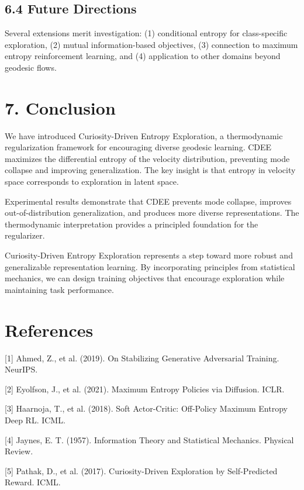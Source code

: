 \documentclass[12pt]{article}
\begin{document}
\subsection{6.4 Future Directions}

Several extensions merit investigation: (1) conditional entropy for class-specific exploration, (2) mutual information-based objectives, (3) connection to maximum entropy reinforcement learning, and (4) application to other domains beyond geodesic flows.

\section{7. Conclusion}

We have introduced Curiosity-Driven Entropy Exploration, a thermodynamic regularization framework for encouraging diverse geodesic learning. CDEE maximizes the differential entropy of the velocity distribution, preventing mode collapse and improving generalization. The key insight is that entropy in velocity space corresponds to exploration in latent space.

Experimental results demonstrate that CDEE prevents mode collapse, improves out-of-distribution generalization, and produces more diverse representations. The thermodynamic interpretation provides a principled foundation for the regularizer.

Curiosity-Driven Entropy Exploration represents a step toward more robust and generalizable representation learning. By incorporating principles from statistical mechanics, we can design training objectives that encourage exploration while maintaining task performance.

\section*{References}

[1] Ahmed, Z., et al. (2019). On Stabilizing Generative Adversarial Training. NeurIPS.

[2] Eyolfson, J., et al. (2021). Maximum Entropy Policies via Diffusion. ICLR.

[3] Haarnoja, T., et al. (2018). Soft Actor-Critic: Off-Policy Maximum Entropy Deep RL. ICML.

[4] Jaynes, E. T. (1957). Information Theory and Statistical Mechanics. Physical Review.

[5] Pathak, D., et al. (2017). Curiosity-Driven Exploration by Self-Predicted Reward. ICML.
\end{document}
